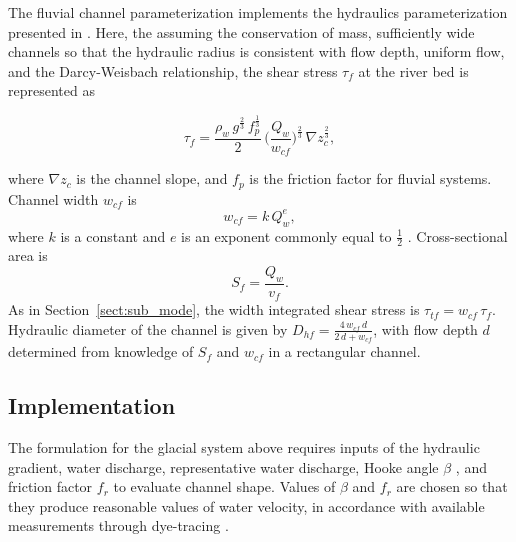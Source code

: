 \documentclass[11pt]{article}
\begin{document}
\begin{spacing}{1}
          The fluvial channel parameterization implements the hydraulics parameterization presented in \citet{tucker1997}.
          Here, the assuming the conservation of mass, sufficiently wide channels so that the hydraulic radius is consistent with flow depth, uniform flow, and the Darcy-Weisbach relationship,
          the shear stress $\tau_f$ at the river bed is represented as
          \begin{linenomath*}
            \begin{equation}
              \label{eq:DW_tau}
              \tau_f=\frac{\rho_w\,g^{\frac{2}{3}}\,f_p^{\frac{1}{3}}}{2}\, \Big(\frac{Q_w}{w_{cf}} \Big)^{\frac{2}{3}} \,\nabla z_{c}^{\frac{2}{3}},
            \end{equation}
          \end{linenomath*}
          where $\nabla z_{c}$ is the channel slope, and $f_p$ is the friction factor for fluvial systems.
          Channel width $w_{cf}$ is 
          \begin{equation}
            \label{eq:wcf}
            w_{cf} = k \, Q_w^e,
          \end{equation}
          where $k$ is a constant and $e$ is an exponent commonly equal to $\frac{1}{2}$ \citep{leopold1953}. Cross-sectional area is 
          \begin{equation}
            \label{eq:Sf}
            S_f= \frac{Q_w}{v_f}.
          \end{equation}
          As in Section~\ref{sect:sub_mode}, the width integrated shear stress is $\tau_{tf}=w_{cf}\,\tau_f$.
          Hydraulic diameter of the channel is given by $D_{hf} = \frac{4\,w_{cf}\,d}{2\,d+w_{cf}}$, with flow depth $d$ determined from knowledge of $S_f$ and $w_{cf}$ in a rectangular channel.
          
          \subsection{Implementation}
        
          The formulation for the glacial system above requires inputs of the hydraulic gradient, water discharge, representative water discharge, Hooke angle $\beta$ \citep{hooke1990}, and friction factor $f_r$ to evaluate channel shape.
          Values of $\beta$ and $f_r$ are chosen so that they produce reasonable values of water velocity, in accordance with available measurements through dye-tracing \citep[Section~\ref{sect:sub_mode}, Figure~\ref{fig:model_outs}; e.g.][]{werder2010}.
          

\end{spacing}
\end{document}
